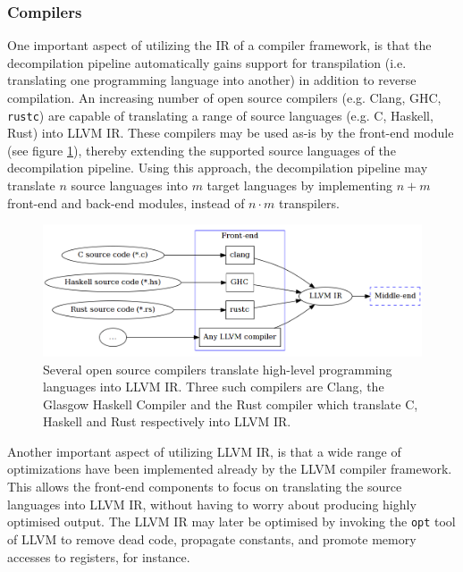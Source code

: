 
\subsubsection{Compilers}
\label{sec:design_compilers}

One important aspect of utilizing the IR of a compiler framework, is that the decompilation pipeline automatically gains support for transpilation (i.e. translating one programming language into another) in addition to reverse compilation. An increasing number of open source compilers (e.g. Clang, GHC, \texttt{rustc}) are capable of translating a range of source languages (e.g. C, Haskell, Rust) into LLVM IR. These compilers may be used as-is by the front-end module (see figure \ref{fig:front-end_source}), thereby extending the supported source languages of the decompilation pipeline. Using this approach, the decompilation pipeline may translate $ n $ source languages into $ m $ target languages by implementing $ n + m $ front-end and back-end modules, instead of $ n \cdot m $ transpilers.

\begin{figure}[htbp]
	\begin{center}
		\includegraphics[width=\textwidth]{inc/6_design/front-end_source.png}
		\caption{Several open source compilers translate high-level programming languages into LLVM IR. Three such compilers are Clang, the Glasgow Haskell Compiler and the Rust compiler which translate C, Haskell and Rust respectively into LLVM IR.}
		\label{fig:front-end_source}
	\end{center}
\end{figure}

Another important aspect of utilizing LLVM IR, is that a wide range of optimizations have been implemented already by the LLVM compiler framework. This allows the front-end components to focus on translating the source languages into LLVM IR, without having to worry about producing highly optimised output. The LLVM IR may later be optimised by invoking the \texttt{opt} tool of LLVM to remove dead code, propagate constants, and promote memory accesses to registers, for instance.
